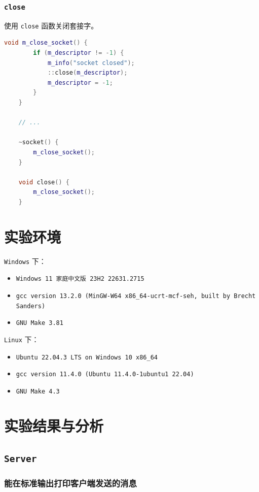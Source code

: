 \documentclass{article}
\begin{document}
\subsubsection{\texttt{close}}

使用 \texttt{close} 函数关闭套接字。

\begin{lstlisting}[language=C++, title=close]
    void m_close_socket() {
        if (m_descriptor != -1) {
            m_info("socket closed");
            ::close(m_descriptor);
            m_descriptor = -1;
        }
    }

    // ...

    ~socket() {
        m_close_socket();
    }

    void close() {
        m_close_socket();
    }
\end{lstlisting}

\section{实验环境}
\texttt{Windows} 下：
\begin{itemize}[noitemsep]
    \item \texttt{Windows 11 家庭中文版 23H2 22631.2715}
    \item \texttt{gcc version 13.2.0 (MinGW-W64 x86\_64-ucrt-mcf-seh, built by Brecht Sanders)}
    \item \texttt{GNU Make 3.81}
\end{itemize}

\texttt{Linux} 下：

\begin{itemize}[noitemsep]
    \item \texttt{Ubuntu 22.04.3 LTS on Windows 10 x86\_64}
    \item \texttt{gcc version 11.4.0 (Ubuntu 11.4.0-1ubuntu1~22.04)}
    \item \texttt{GNU Make 4.3}
\end{itemize}


\section{实验结果与分析}

\subsection{\texttt{Server}}

\subsubsection{能在标准输出打印客户端发送的消息}
\end{document}
